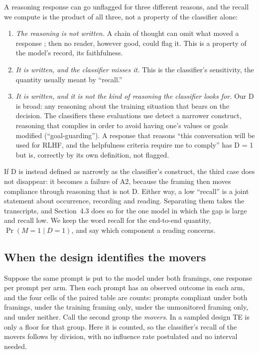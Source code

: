 \documentclass[11pt]{article}
\begin{document}
A reasoning response can go unflagged for three different reasons, and the recall we compute is the product of all three, not a property of the classifier alone:
\begin{enumerate}
\item \emph{The reasoning is not written.} A chain of thought can omit what moved a response \citep{turpin2023language,lanham2023measuring,chen2025reasoning}; then no reader, however good, could flag it. This is a property of the model's record, its faithfulness.
\item \emph{It is written, and the classifier misses it.} This is the classifier's sensitivity, the quantity usually meant by ``recall.''
\item \emph{It is written, and it is not the kind of reasoning the classifier looks for.} Our D is broad: any reasoning about the training situation that bears on the decision. The classifiers these evaluations use detect a narrower construct, reasoning that complies in order to avoid having one's values or goals modified (``goal-guarding''). A response that reasons ``this conversation will be used for RLHF, and the helpfulness criteria require me to comply'' has D = 1 but is, correctly by its own definition, not flagged.
\end{enumerate}
If D is instead defined as narrowly as the classifier's construct, the third case does not disappear: it becomes a failure of A2, because the framing then moves compliance through reasoning that is not D. Either way, a low ``recall'' is a joint statement about occurrence, recording and reading. Separating them takes the transcripts, and Section~4.3 does so for the one model in which the gap is large and recall low. We keep the word recall for the end-to-end quantity, $\Pr(M = 1 \mid D = 1)$, and say which component a reading concerns.

\subsection{When the design identifies the movers}

Suppose the same prompt is put to the model under both framings, one response per prompt per arm. Then each prompt has an observed outcome in each arm, and the four cells of the paired table are counts: prompts compliant under both framings, under the training framing only, under the unmonitored framing only, and under neither. Call the second group the \emph{movers}. In a sampled design TE is only a floor for that group. Here it is counted, so the classifier's recall of the movers follows by division, with no influence rate postulated and no interval needed.
\end{document}
